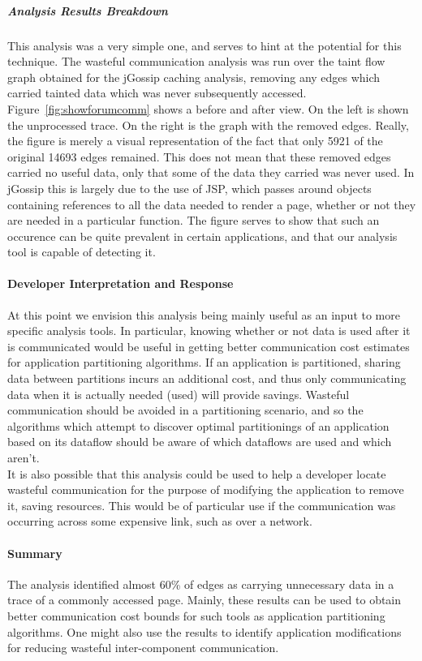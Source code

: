 \documentclass[msc,oneside]{ubcthesis}
\begin{document}
\subparagraph{Analysis Results Breakdown}
This analysis was a very simple one, and serves to hint at the potential for this technique. The wasteful communication analysis was run over the taint flow graph obtained for the jGossip caching analysis, removing any edges which carried tainted data which was never subsequently accessed. Figure~\ref{fig:showforumcomm} shows a before and after view. On the left is shown the unprocessed trace. On the right is the graph with the removed edges. Really, the figure is merely a visual representation of the fact that only 5921 of the original 14693 edges remained. This does not mean that these removed edges carried no useful data, only that some of the data they carried was never used. In jGossip this is largely due to the use of JSP, which passes around objects containing references to all the data needed to render a page, whether or not they are needed in a particular function. The figure serves to show that such an occurence can be quite prevalent in certain applications, and that our analysis tool is capable of detecting it.

\paragraph{Developer Interpretation and Response}
At this point we envision this analysis being mainly useful as an input to more specific analysis tools. In particular, knowing whether or not data is used after it is communicated would be useful in getting better communication cost estimates for application partitioning algorithms. If an application is partitioned, sharing data between partitions incurs an additional cost, and thus only communicating data when it is actually needed (used) will provide savings. Wasteful communication should be avoided in a partitioning scenario, and so the algorithms which attempt to discover optimal partitionings of an application based on its dataflow should be aware of which dataflows are used and which aren't.\\

It is also possible that this analysis could be used to help a developer locate wasteful communication for the purpose of modifying the application to remove it, saving resources. This would be of particular use if the communication was occurring across some expensive link, such as over a network.

\paragraph{Summary}
The analysis identified almost 60\% of edges as carrying unnecessary data in a trace of a commonly accessed page. Mainly, these results can be used to obtain better communication cost bounds for such tools as application partitioning algorithms. One might also use the results to identify application modifications for reducing wasteful inter-component communication.
\end{document}
